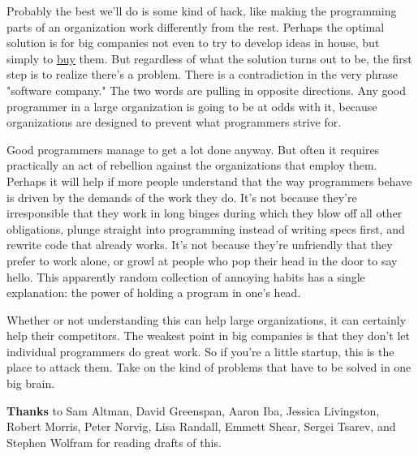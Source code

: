 Probably the best we'll do is some kind of hack, like making the
programming parts of an organization work differently from the rest.
Perhaps the optimal solution is for big companies not even to try
to develop ideas in house, but simply to 
\href{http://www.paulgraham.com/hiring.html}{buy} them.  But regardless
of what the solution turns out to be, the first step is to realize
there's a problem.  There is a contradiction in the very phrase
"software company."   The two words are pulling in opposite directions.
Any good programmer in a large organization is going to be at odds
with it, because organizations are designed to prevent what
programmers strive for.

Good programmers manage to get a lot done anyway.  
But often it
requires practically an act of rebellion against the organizations
that employ them.  Perhaps it will help if more people understand that the way
programmers behave is driven by the demands of the work they do.
It's not because they're irresponsible that they work in long binges
during which they blow off all other obligations, plunge straight into
programming instead of writing specs first, and rewrite code that
already works.  It's not because they're unfriendly that they prefer
to work alone, or growl at people who pop their head in the door
to say hello.  This apparently random collection of annoying habits
has a single explanation: the power of holding a program in one's
head.

Whether or not understanding this can help large organizations, it
can certainly help their competitors.  The weakest point in big
companies is that they don't let individual programmers do great
work.  So if you're a little startup, this is the place to attack
them.  Take on the kind of problems that have to be solved in one
big brain.






\textbf{Thanks} to Sam Altman, David Greenspan, Aaron Iba, Jessica Livingston,
Robert Morris, Peter Norvig, Lisa Randall, Emmett Shear, Sergei Tsarev,
and Stephen Wolfram for reading drafts of this.


